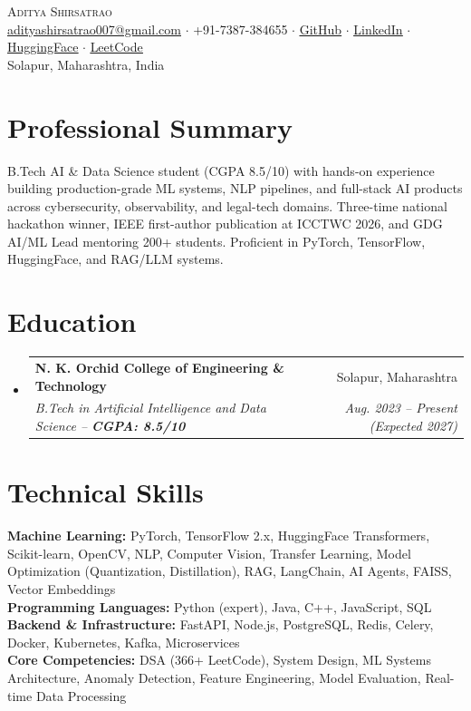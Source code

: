 \documentclass[letterpaper,11pt]{article}
\makeatletter
\newcommand{\resumeSubheading}[4]{
  \vspace{-2pt}\item
  \begin{tabular*}{0.97\textwidth}[t]{l@{\extracolsep{\fill}}r}
    \textbf{#1} & #2 \\
    \textit{\small #3} & \textit{\small #4} \\
  \end{tabular*}\vspace{-7pt}
}
\newcommand{\resumeSubHeadingListStart}{
\begin{itemize}[leftmargin=0.15in, label={}]
}
\newcommand{\resumeSubHeadingListEnd}{
\end{itemize}
}
\makeatother
\begin{document}
\begin{center}
    {\Huge \scshape \color{darkblue} Aditya Shirsatrao} \\ \vspace{3pt}
    \small
    \href{mailto:adityashirsatrao007@gmail.com}{\underline{adityashirsatrao007@gmail.com}} $\cdot$
    +91-7387-384655 $\cdot$
    \href{https://github.com/adityashirsatrao007}{\underline{GitHub}} $\cdot$
    \href{https://www.linkedin.com/in/adityashirsatrao}{\underline{LinkedIn}} $\cdot$
    \href{https://huggingface.co/adityashirsatrao007}{\underline{HuggingFace}} $\cdot$
    \href{https://leetcode.com/u/adityashirsatrao007}{\underline{LeetCode}} \\
    \small Solapur, Maharashtra, India
\end{center}

\section{Professional Summary}
\small{
B.Tech AI \& Data Science student (CGPA 8.5/10) with hands-on experience building production-grade ML systems, NLP pipelines, and full-stack AI products across cybersecurity, observability, and legal-tech domains. Three-time national hackathon winner, IEEE first-author publication at ICCTWC 2026, and GDG AI/ML Lead mentoring 200+ students. Proficient in PyTorch, TensorFlow, HuggingFace, and RAG/LLM systems.
}

\section{Education}
\resumeSubHeadingListStart
\resumeSubheading
{N. K. Orchid College of Engineering \& Technology}{Solapur, Maharashtra}
{B.Tech in Artificial Intelligence and Data Science -- \textbf{CGPA: 8.5/10}}{Aug. 2023 -- Present (Expected 2027)}
\resumeSubHeadingListEnd

\section{Technical Skills}
\begin{itemize}[leftmargin=0.15in, label={}]
\small{
\item{
\textbf{Machine Learning:} PyTorch, TensorFlow 2.x, HuggingFace Transformers, Scikit-learn, OpenCV, NLP, Computer Vision, Transfer Learning, Model Optimization (Quantization, Distillation), RAG, LangChain, AI Agents, FAISS, Vector Embeddings \\
\textbf{Programming Languages:} Python (expert), Java, C++, JavaScript, SQL \\
\textbf{Backend \& Infrastructure:} FastAPI, Node.js, PostgreSQL, Redis, Celery, Docker, Kubernetes, Kafka, Microservices \\
\textbf{Core Competencies:} DSA (366+ LeetCode), System Design, ML Systems Architecture, Anomaly Detection, Feature Engineering, Model Evaluation, Real-time Data Processing
}
}
\end{itemize}
\end{document}
